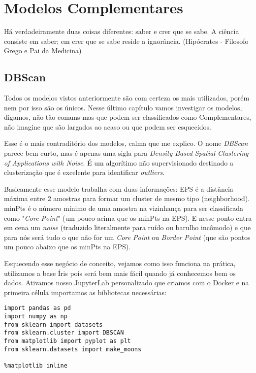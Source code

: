 \chapter{Modelos Complementares}

\begin{remark}
Há verdadeiramente duas coisas diferentes: saber e crer que se sabe. A ciência consiste em saber; em crer que se sabe reside a ignorância. (Hipócrates - Filosofo Grego e Pai da Medicina) 
\end{remark}

\section{DBScan}
Todos os modelos vistos anteriormente são com certeza os mais utilizados, porém nem por isso são os únicos. Nesse último capítulo vamos investigar os modelos, digamos, não tão comuns mas que podem ser classificados como Complementares, não imagine que são largados ao acaso ou que podem ser esquecidos.

Esse é o mais contraditório dos modelos, calma que me explico. O nome \textit{DBScan} parece bem curto, mas é apenas uma sigla para \textit{Density-Based Spatial Clustering of Applications with Noise}. É um algorítimo não supervisionado destinado a clusterização que é excelente para identificar \textit{outliers}.

Basicamente esse modelo trabalha com duas informações: EPS é a distância máxima entre 2 amostras para formar um cluster de mesmo tipo (neighborhood). minPts é o número mínimo de uma amostra na vizinhança para ser classificada como "\textit{Core Point}" (um pouco acima que os minPts na EPS). E nesse ponto entra em cena um \textit{noise} (traduzido literalmente para ruído ou barulho incômodo) e que para nós será tudo o que não for um \textit{Core Point} ou \textit{Border Point} (que são pontos um pouco abaixo que os minPts na EPS).

Esquecendo esse negócio de conceito, vejamos como isso funciona na prática, utilizamos a base Íris pois será bem mais fácil quando já conhecemos bem os dados. Ativamos nosso JupyterLab personalizado que criamos com o Docker e na primeira célula importamos as bibliotecas necessárias:
\begin{lstlisting}[]
import pandas as pd
import numpy as np
from sklearn import datasets
from sklearn.cluster import DBSCAN
from matplotlib import pyplot as plt
from sklearn.datasets import make_moons

%matplotlib inline
\end{lstlisting}

